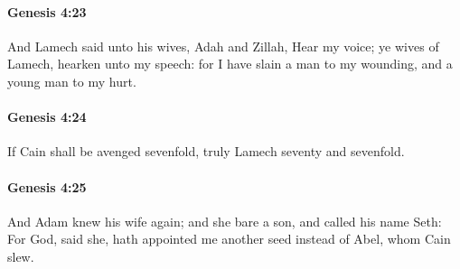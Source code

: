 		\paragraph{Genesis 4:23} %
			\label{GENESIS-4-23}

			And Lamech said unto his wives, Adah and Zillah, Hear my voice; ye wives of Lamech, hearken unto my speech: for I have slain a man to my wounding, and a young man to my hurt.


		\paragraph{Genesis 4:24} %
			\label{GENESIS-4-24}

			If Cain shall be avenged sevenfold, truly Lamech seventy and sevenfold.


		\paragraph{Genesis 4:25} %
			\label{GENESIS-4-25}

			And Adam knew his wife again; and she bare a son, and called his name Seth: For God, said she, hath appointed me another seed instead of Abel, whom Cain slew.


